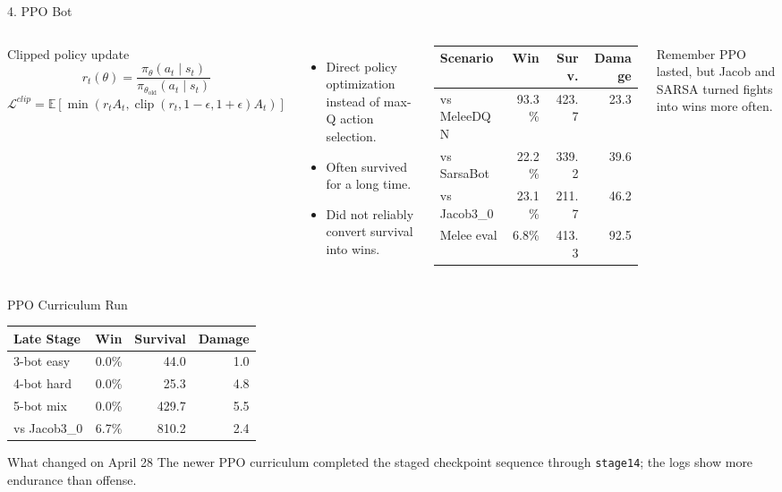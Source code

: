 \documentclass[12pt,aspectratio=169]{beamer}
\begin{document}
\begin{frame}{4. PPO Bot}
\begin{columns}[T,totalwidth=\textwidth]
\begin{block}{Clipped policy update}
\[
r_t(\theta)=\frac{\pi_\theta(a_t\mid s_t)}
{\pi_{\theta_{\mathrm{old}}}(a_t\mid s_t)}
\]
\[
\mathcal{L}^{clip}=\mathbb{E}[\min(r_tA_t,
\operatorname{clip}(r_t,1-\epsilon,1+\epsilon)A_t)]
\]
\end{block}
\begin{itemize}
  \item Direct policy optimization instead of max-Q action selection.
  \item Often survived for a long time.
  \item Did not reliably convert survival into wins.
\end{itemize}

\small
\begin{table}
\centering
\begin{tabular}{lrrr}
\toprule
\textbf{Scenario} & \textbf{Win} & \textbf{Surv.} & \textbf{Damage} \\
\midrule
vs MeleeDQN & 93.3\% & 423.7 & 23.3 \\
vs SarsaBot & 22.2\% & 339.2 & 39.6 \\
vs Jacob3\_0 & 23.1\% & 211.7 & 46.2 \\
Melee eval & 6.8\% & 413.3 & 92.5 \\
\bottomrule
\end{tabular}
\end{table}
\begin{block}{Remember}
PPO lasted, but Jacob and SARSA turned fights into wins more often.
\end{block}
\end{columns}
\end{frame}

\begin{frame}{PPO Curriculum Run}
\small
\begin{table}
\centering
\begin{tabular}{lrrr}
\toprule
\textbf{Late Stage} & \textbf{Win} & \textbf{Survival} & \textbf{Damage} \\
\midrule
3-bot easy & 0.0\% & 44.0 & 1.0 \\
4-bot hard & 0.0\% & 25.3 & 4.8 \\
5-bot mix & 0.0\% & 429.7 & 5.5 \\
vs Jacob3\_0 & 6.7\% & 810.2 & 2.4 \\
\bottomrule
\end{tabular}
\end{table}

\begin{block}{What changed on April 28}
The newer PPO curriculum completed the staged checkpoint sequence through \texttt{stage14}; the logs show more endurance than offense.
\end{block}
\end{frame}
\end{document}

